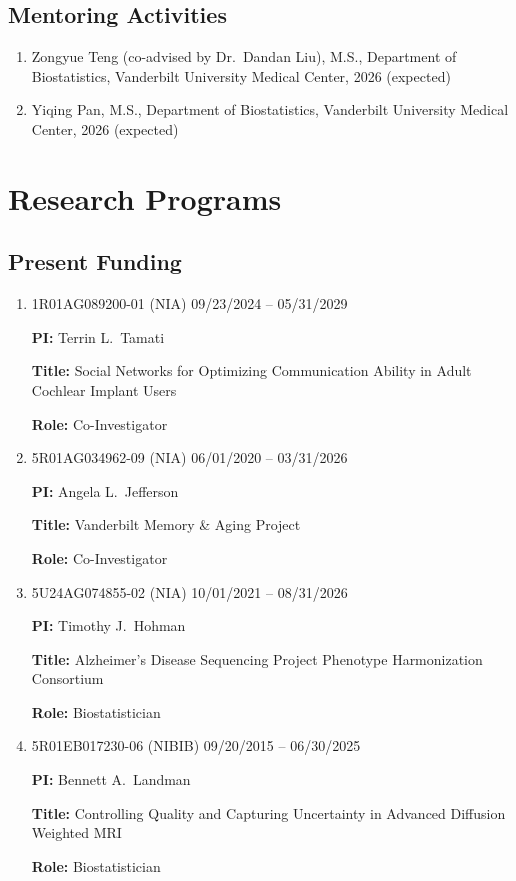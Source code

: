 \documentclass[12pt]{article}
\begin{document}
	\subsection*{Mentoring Activities}
	\begin{enumerate}
		\item Zongyue Teng (co-advised by Dr.\ Dandan Liu), M.S., 
		Department of Biostatistics, Vanderbilt University Medical 
		Center, 2026 (expected)
		\item Yiqing Pan, M.S., Department of Biostatistics, Vanderbilt 
		University Medical Center, 2026 (expected)
	\end{enumerate}

	\section*{Research Programs}
	\subsection*{Present Funding}
	\begin{enumerate}
		\item 1R01AG089200-01 (NIA) \hfill 09/23/2024 -- 
		05/31/2029
		
		{\bf PI:} Terrin L.\ Tamati 
		
		{\bf Title:} Social Networks for Optimizing Communication 
		Ability in Adult Cochlear Implant Users
		
		{\bf Role:} Co-Investigator
		
		\item 5R01AG034962-09 (NIA) \hfill 06/01/2020 -- 03/31/2026
		
		{\bf PI:} Angela L.\ Jefferson
		
		{\bf Title:} Vanderbilt Memory \& Aging Project
		
		{\bf Role:} Co-Investigator
		
		\item 5U24AG074855-02 (NIA) \hfill 10/01/2021 -- 08/31/2026
		
		{\bf PI:} Timothy J.\ Hohman
		
		{\bf Title:} Alzheimer's Disease Sequencing Project Phenotype Harmonization Consortium
		
		{\bf Role:} Biostatistician
		
		\item 5R01EB017230-06 (NIBIB) \hfill 09/20/2015 -- 06/30/2025
		
		{\bf PI:} Bennett A.\ Landman
		
		{\bf Title:} Controlling Quality and Capturing Uncertainty 
		in Advanced Diffusion Weighted MRI
		
		{\bf Role:} Biostatistician
	\end{enumerate}
	
\end{document}
